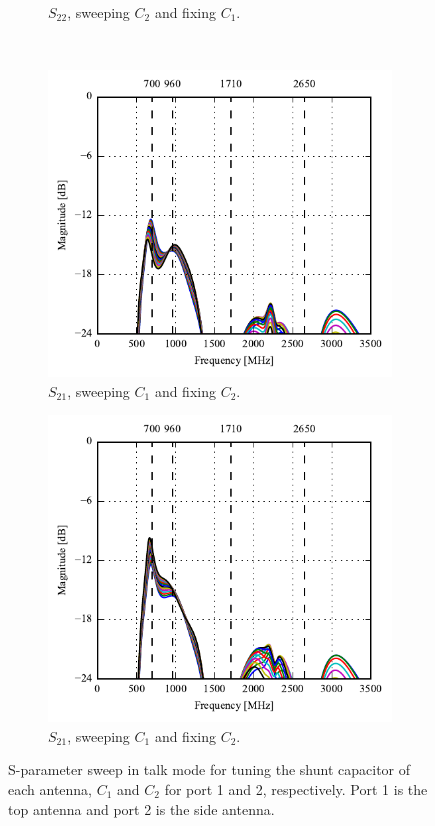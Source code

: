\begin{figure}[htbp]
\begin{subfigure}[b]{0.49\linewidth}
        \caption{$S_{22}$, sweeping $C_2$ and fixing $C_1$.}
    \end{subfigure}
~
    \begin{subfigure}[b]{0.49\linewidth}
        \centering
        \includegraphics{img/tech_sol/monopole/talk_mode/s21_s11}
        \caption{$S_{21}$, sweeping $C_1$ and fixing $C_2$.}
    \end{subfigure}
    \hfill
    \begin{subfigure}[b]{0.49\linewidth}
        \centering
        \includegraphics{img/tech_sol/monopole/talk_mode/s21_s22}
        \caption{$S_{21}$, sweeping $C_1$ and fixing $C_2$.}
    \end{subfigure}
    \caption{S-parameter sweep in talk mode for tuning the shunt capacitor of each antenna, $C_1$ and $C_2$ for port 1 and 2, respectively. Port 1 is the top antenna and port 2 is the side antenna.}
    \label{fig:sparam_mono_talk_mode}
\end{figure}
